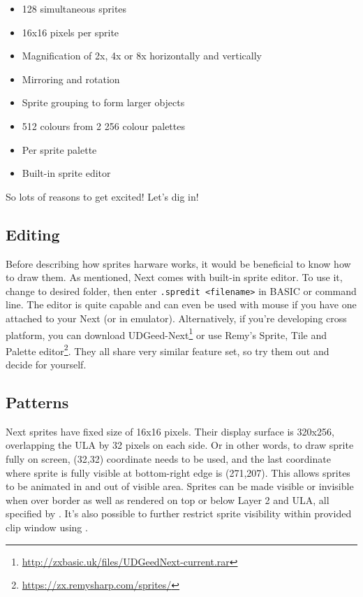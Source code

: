 \documentclass[12pt,twoside,openright,a4paper]{book}
\begin{document}
\begin{itemize}[topsep=1pt,itemsep=1pt]
	\item 128 simultaneous sprites
	\item 16x16 pixels per sprite
	\item Magnification of 2x, 4x or 8x horizontally and vertically
	\item Mirroring and rotation
	\item Sprite grouping to form larger objects
	\item 512 colours from 2 256 colour palettes
	\item Per sprite palette
	\item Built-in sprite editor
\end{itemize}

So lots of reasons to get excited! Let's dig in!

\subsection{Editing}

Before describing how sprites harware works, it would be beneficial to know how to draw them. As mentioned, Next comes with built-in sprite editor. To use it, change to desired folder, then enter {\tt .spredit <filename>} in BASIC or command line. The editor is quite capable and can even be used with mouse if you have one attached to your Next (or in emulator). Alternatively, if you're developing cross platform, you can download UDGeed-Next\footnote{\url{http://zxbasic.uk/files/UDGeedNext-current.rar}} or use Remy's Sprite, Tile and Palette editor\footnote{\url{https://zx.remysharp.com/sprites/}}. They all share very similar feature set, so try them out and decide for yourself.


\subsection{Patterns}

Next sprites have fixed size of 16x16 pixels. Their display surface is 320x256, overlapping the ULA by 32 pixels on each side. Or in other words, to draw sprite fully on screen, (32,32) coordinate needs to be used, and the last coordinate where sprite is fully visible at bottom-right edge is (271,207). This allows sprites to be animated in and out of visible area. Sprites can be made visible or invisible when over border as well as rendered on top or below Layer 2 and ULA, all specified by . It's also possible to further restrict sprite visibility within provided clip window using .
\end{document}
